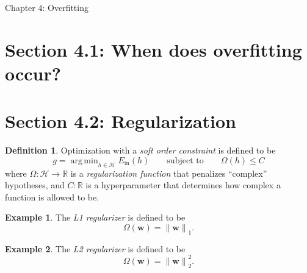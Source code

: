 \documentclass[10pt]{exam}
\theoremstyle{definition}
\newtheorem{example}{Example}
\newtheorem{defn}{Definition}
\newcommand{\R}{\mathbb R}
\DeclareMathOperator*{\argmin}{arg\,min}
\newcommand{\Ein}{E_{\text{in}}}
\newcommand{\Eout}{E_{\text{out}}}
\newcommand{\w}{\mathbf w}
\newcommand{\lone}[1]{{\lVert {#1} \rVert}_1}
\newcommand{\ltwo}[1]{{\lVert {#1} \rVert}_2}
\begin{document}
\begin{center}
{
\Huge
Chapter 4: Overfitting
}
\end{center}

\section*{Section 4.1: When does overfitting occur?}

\newpage
\section*{Section 4.2: Regularization}


\begin{defn}
Optimization with a \emph{soft order constraint} is defined to be
\begin{equation}
    \label{eq:soc}
    g = \argmin_{h\in\mathcal H} \Ein(h) \qquad \text{subject to}\qquad \Omega(h) \le C
\end{equation}
where $\Omega : \mathcal H \to \R$ is a \emph{regularization function} that penalizes ``complex'' hypotheses,
    and $C : \R$ is a hyperparameter that determines how complex a function is allowed to be.
\end{defn}

\begin{example}
    The \emph{L1 regularizer} is defined to be
    \begin{equation}
        \Omega(\w) = \lone{\w}
        .
    \end{equation}
\end{example}

\begin{example}
    The \emph{L2 regularizer} is defined to be
    \begin{equation}
        \Omega(\w) = \ltwo{\w}^2
        .
    \end{equation}
\end{example}
\end{document}
